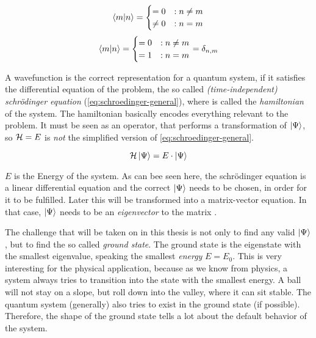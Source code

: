 \begin{equation}
    \label{eq:base-orthagonal}
    \bra{m}\ket{n} = \begin{cases}
         = 0 &: n\neq m\\
         \neq 0 &: n = m
    \end{cases}
\end{equation}
\begin{equation}
    \label{eq:base-orthonormal}
    \bra{m}\ket{n} = \begin{cases}
         = 0 &: n\neq m\\
         = 1 &: n = m
    \end{cases} = \delta_{n, m}
\end{equation}

A wavefunction is the correct representation for a quantum system, if it satisfies the differential equation of the problem, the so called \emph{(time-independent) schrödinger equation} (\autoref{eq:schroedinger-general}), where \hamiltonian is called the \emph{hamiltonian} of the system. The hamiltonian basically \glqq encodes\grqq{} everything relevant to the problem. It must be seen as an operator, that performs a transformation of $\ket{\Psi}$, so $\mathcal{H} = E$ is \emph{not} the simplified version of \autoref{eq:schroedinger-general}.

\begin{equation}
    \label{eq:schroedinger-general}
    \mathcal{H} \ket{\Psi} = E \cdot \ket{\Psi}
\end{equation}

$E$ is the Energy of the system. As can bee seen here, the schrödinger equation is a linear differential equation and the correct $\ket{\Psi}$ needs to be chosen, in order for it to be fulfilled. Later this will be transformed into a matrix-vector equation. In that case, $\ket{\Psi}$ needs to be an \emph{eigenvector} to the matrix \hamiltonian.

The challenge that will be taken on in this thesis is not only to find any valid $\ket{\Psi}$, but to find the so called \emph{ground state}. The ground state is the eigenstate with the smallest eigenvalue, speaking the smallest \emph{energy} $E = E_0$. 
This is very interesting for the physical application, because as we know from physics, a system always tries to transition into the state  with the smallest energy. A ball will not stay on a slope, but roll down into the valley, where it can sit stable. The quantum system (generally) also tries to exist in the ground state (if possible). Therefore, the shape of the ground state tells a lot about the \glqq default\grqq{} behavior of the system.